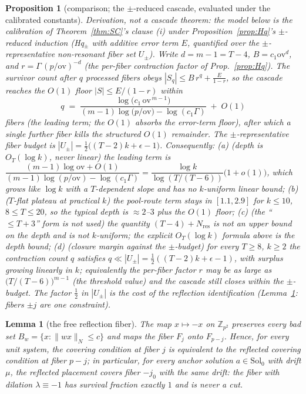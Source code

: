\documentclass[11pt,a4paper]{article}
\numberwithin{equation}{section}
\theoremstyle{plain}
\theoremstyle{plain}
\newtheorem{lemma}[theorem]{Lemma}
\newtheorem{proposition}[theorem]{Proposition}
\theoremstyle{definition}
\theoremstyle{remark}
\newcommand{\Z}{\mathbb{Z}}
\newcommand{\wn}[1]{\lVert #1 \rVert_{N}}
\begin{document}
\begin{proposition}[comparison; the $\pm$-reduced cascade, evaluated under
the calibrated constants]
\label{prop:depth}
\emph{Derivation, not a cascade theorem}: the model below is the
calibration of Theorem~\ref{thm:SC}'s clause (i) under
Proposition~\ref{prop:Hq}'s $\pm$-reduced induction (Hq$_\pm$ with additive
error term $E$, quantified over the $\pm$-representative non-resonant fiber
set $U_\pm$). Write $d=m-1=T-4$, $B=c_1\mathrm{ov}^{d}$, and
$r=\Gamma\,(p/\mathrm{ov})^{-d}$ (the per-fiber contraction factor of
Prop.~\ref{prop:Hq}). The survivor count after $q$ processed fibers obeys
$|S_q|\le B\,r^{q}+\tfrac{E}{1-r}$, so the cascade reaches the $O(1)$ floor
$|S|\le E/(1-r)$ within
\[
q\;=\;\frac{\log\!\bigl(c_1\,\mathrm{ov}^{\,m-1}\bigr)}
{(m-1)\log\!\bigl(p/\mathrm{ov}\bigr)-\log(c_1\Gamma)}\;+\;O(1)
\]
fibers (the leading term; the $O(1)$ absorbs the error-term floor), after
which a single further fiber kills the structured $O(1)$ remainder. The
$\pm$-representative fiber budget is $|U_\pm|=\tfrac12\bigl((T-2)k+\epsilon-1\bigr)$.
Consequently:
\emph{(a)} (depth is $O_T(\log k)$, never linear) the leading term is
$\dfrac{(m-1)\log\mathrm{ov}+O(1)}{(m-1)\log(p/\mathrm{ov})-\log(c_1\Gamma)}
=\dfrac{\log k}{\log(T/(T-6))}\bigl(1+o(1)\bigr)$, which grows like $\log k$
with a $T$-dependent slope and has \emph{no} $k$-uniform linear bound;
\emph{(b)} ($T$-flat plateau at practical $k$) the pool-route term stays in
$[1.1,2.9]$ for $k\le10$, $8\le T\le20$, so the typical depth is
$\approx 2$--$3$ plus the $O(1)$ floor;
\emph{(c)} (the ``$\le T+3$'' form is not used) the quantity
$(T-4)+N_{\mathrm{res}}$ is \emph{not} an upper bound on
the depth and is not $k$-uniform; the explicit
$O_T(\log k)$ formula above is the depth bound;
\emph{(d)} (closure margin against the $\pm$-budget) for every $T\ge8$,
$k\ge2$ the contraction count $q$ satisfies $q\ll|U_\pm|=\tfrac12((T-2)k+\epsilon-1)$,
with surplus growing linearly in $k$; equivalently the per-fiber factor $r$
may be as large as $\bigl(T/(T-6)\bigr)^{m-1}$ (the threshold value) and the
cascade still closes within the $\pm$-budget. The factor $\tfrac12$ in
$|U_\pm|$ is the cost of the reflection identification
(Lemma~\ref{lem:reflect}: fibers $\pm j$ are one constraint).
\end{proposition}

\begin{lemma}[the free reflection fiber]\label{lem:reflect}
The map $x\mapsto-x$ on $\Z_{p^2}$ preserves every bad set
$B_w=\{x:\wn{wx}\le c\}$ and maps the fiber $F_j$ onto $F_{p-j}$. Hence,
for every unit system, the covering condition at fiber $j$ is
equivalent to the reflected covering condition at fiber $p-j$; in
particular, for every anchor solution $a\in\mathrm{Sol}_0$ with drift
$\mu$, the reflected placement covers fiber $-j_0$ with the same drift:
the fiber with dilation $\lambda\equiv-1$ has survival fraction exactly
$1$ and is never a cut.
\end{lemma}
\end{document}
